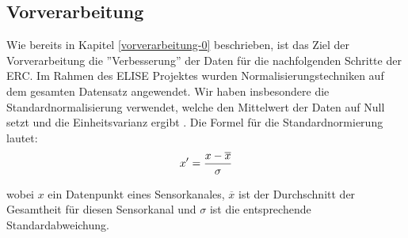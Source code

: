 \subsection{Vorverarbeitung} \label{vorverarbeitung-1}

Wie bereits in Kapitel \ref{vorverarbeitung-0} beschrieben, ist das Ziel der Vorverarbeitung die ”Verbesserung” der Daten f{\"u}r die nachfolgenden Schritte der ERC.
Im Rahmen des ELISE Projektes wurden Normalisierungstechniken auf dem gesamten Datensatz angewendet. 
Wir haben insbesondere die Standardnormalisierung verwendet, welche den Mittelwert der Daten auf Null setzt und die Einheitsvarianz ergibt \cite{grus15}. 
Die Formel f{\"u}r die Standardnormierung lautet:
\begin{equation} 
\Large{ {x'={\frac {x-{\overline {x}}}{\sigma }}} } 
\label{equ:norm} \end{equation} %

wobei $ x $ ein Datenpunkt eines Sensorkanales, $ \overline{x} $ ist der Durchschnitt der Gesamtheit f{\"u}r diesen Sensorkanal und $ \sigma $ ist die entsprechende Standardabweichung. \\